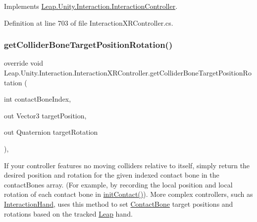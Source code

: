 Implements \mbox{\hyperlink{class_leap_1_1_unity_1_1_interaction_1_1_interaction_controller_a5d182056bac8aea2d0ec005e35f768ca}{Leap.\+Unity.\+Interaction.\+Interaction\+Controller}}.



Definition at line 703 of file Interaction\+X\+R\+Controller.\+cs.

\mbox{\label{class_leap_1_1_unity_1_1_interaction_1_1_interaction_x_r_controller_a6870022c14d8cea42d36502b7a0a299f}} 
\subsubsection{\texorpdfstring{getColliderBoneTargetPositionRotation()}{getColliderBoneTargetPositionRotation()}}
{\footnotesize\ttfamily override void Leap.\+Unity.\+Interaction.\+Interaction\+X\+R\+Controller.\+get\+Collider\+Bone\+Target\+Position\+Rotation (\begin{DoxyParamCaption}\item[{int}]{contact\+Bone\+Index,  }\item[{out Vector3}]{target\+Position,  }\item[{out Quaternion}]{target\+Rotation }\end{DoxyParamCaption})\hspace{0.3cm}{\ttfamily [protected]}, {\ttfamily [virtual]}}



If your controller features no moving colliders relative to itself, simply return the desired position and rotation for the given indexed contact bone in the contact\+Bones array. (For example, by recording the local position and local rotation of each contact bone in \mbox{\hyperlink{class_leap_1_1_unity_1_1_interaction_1_1_interaction_x_r_controller_a6646ebf671991c5bc47a66b2129538b6}{init\+Contact()}}). More complex controllers, such as \mbox{\hyperlink{class_leap_1_1_unity_1_1_interaction_1_1_interaction_hand}{Interaction\+Hand}}, uses this method to set \mbox{\hyperlink{class_leap_1_1_unity_1_1_interaction_1_1_contact_bone}{Contact\+Bone}} target positions and rotations based on the tracked \mbox{\hyperlink{namespace_leap_1_1_unity_1_1_leap}{Leap}} hand. 



